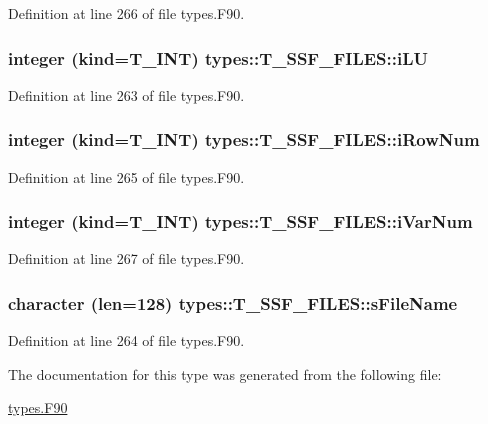 Definition at line 266 of file types.F90.

\hypertarget{typetypes_1_1_t___s_s_f___f_i_l_e_s_ab983ef3514c66132985ad891dc8c87e9}{
\subsubsection[{iLU}]{\setlength{\rightskip}{0pt plus 5cm}integer (kind={\bf T\_\-INT}) {\bf types::T\_\-SSF\_\-FILES::iLU}}}
\label{typetypes_1_1_t___s_s_f___f_i_l_e_s_ab983ef3514c66132985ad891dc8c87e9}


Definition at line 263 of file types.F90.

\hypertarget{typetypes_1_1_t___s_s_f___f_i_l_e_s_a91af02312e475f83174850646de06a0b}{
\subsubsection[{iRowNum}]{\setlength{\rightskip}{0pt plus 5cm}integer (kind={\bf T\_\-INT}) {\bf types::T\_\-SSF\_\-FILES::iRowNum}}}
\label{typetypes_1_1_t___s_s_f___f_i_l_e_s_a91af02312e475f83174850646de06a0b}


Definition at line 265 of file types.F90.

\hypertarget{typetypes_1_1_t___s_s_f___f_i_l_e_s_a1ef52aa6a1e2056f4f925b75532f8fab}{
\subsubsection[{iVarNum}]{\setlength{\rightskip}{0pt plus 5cm}integer (kind={\bf T\_\-INT}) {\bf types::T\_\-SSF\_\-FILES::iVarNum}}}
\label{typetypes_1_1_t___s_s_f___f_i_l_e_s_a1ef52aa6a1e2056f4f925b75532f8fab}


Definition at line 267 of file types.F90.

\hypertarget{typetypes_1_1_t___s_s_f___f_i_l_e_s_aa4d606df754cb64c0059667bdf99f80c}{
\subsubsection[{sFileName}]{\setlength{\rightskip}{0pt plus 5cm}character (len=128) {\bf types::T\_\-SSF\_\-FILES::sFileName}}}
\label{typetypes_1_1_t___s_s_f___f_i_l_e_s_aa4d606df754cb64c0059667bdf99f80c}


Definition at line 264 of file types.F90.



The documentation for this type was generated from the following file:\begin{DoxyCompactItemize}
\item 
\hyperlink{types_8_f90}{types.F90}\end{DoxyCompactItemize}
